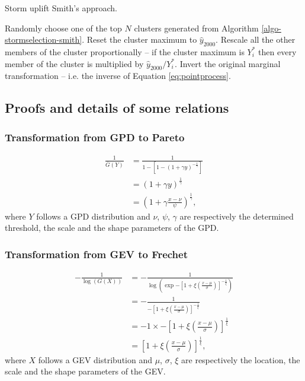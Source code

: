 \begin{algorithm}
	\caption{Storm uplift Smith's approach.}
	\label{algo-stormuplift-smith}
	\begin{algorithmic}
	\State Randomly choose one of the top $N$ clusters generated from Algorithm \ref{algo-stormselection-smith}.
	\State Reset the cluster maximum to $\hat{y}_{2000}$.
	\State Rescale all the other members of the cluster proportionally -- if the cluster maximum is $Y^*_i$ then every member of the cluster is multiplied by $\hat{y}_{2000}/Y^*_i$.
	\State Invert the original marginal transformation -- i.e. the inverse of Equation \ref{eq:pointprocess}.
	\end{algorithmic}
\end{algorithm}

\subsection{Proofs and details of some relations}
\subsubsection{Transformation from GPD to Pareto}
\label{sec:transfoGPD2Pareto}
\begin{align*}
\frac{1}{\overline{G}(Y)} &= \frac{1}{1-\left[1 - \left( 1 + \gamma y   \right)^{-\frac{1}{\gamma}} \right]} \\
						  &= \left( 1 + \gamma y   \right)^{\frac{1}{\gamma}}\\
						  &= \left( 1 + \gamma  \frac{x - \nu}{\psi}   \right)^{\frac{1}{\gamma}} ,
\end{align*} where $Y$ follows a GPD distribution and $\nu$, $\psi$, $\gamma$ are respectively the determined threshold, the scale and the shape parameters of the GPD. 

\subsubsection{Transformation from GEV to Frechet}
\label{sec:transfoGEV2Frechet}
\begin{align*}
-\frac{1}{\log(G(X))} &= - \frac{1}{\log \left( \exp{-\left[ 1+ \xi \left(\frac{x-\mu}{\sigma}\right)\right]^{-\frac{1}{\xi}}} \right)} \\
					  &= - \frac{1}{-\left[ 1+ \xi \left(\frac{x-\mu}{\sigma}\right)\right]^{-\frac{1}{\xi}} } \\
					  &= -1 \times - \left[ 1+ \xi \left(\frac{x-\mu}{\sigma}\right)\right]^{\frac{1}{\xi}}  \\
					  &= \left[ 1+ \xi \left(\frac{x-\mu}{\sigma}\right)\right]^{\frac{1}{\xi}}, 
\end{align*}
where $X$ follows a GEV distribution and $\mu$, $\sigma$, $\xi$ are respectively the location, the scale and the shape parameters of the GEV.
